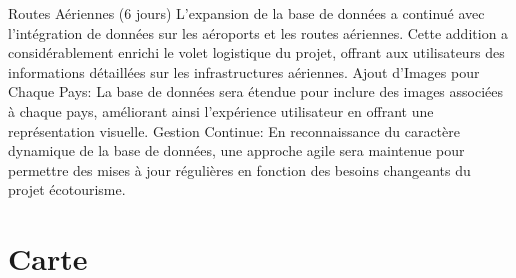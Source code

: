 \documentclass[mstat,12pt]{unswthesis}
\begin{document}
\begin{adjustwidth}{-2cm}{}
\begin{itemize}
  Routes Aériennes (6 jours) L'expansion de la base de données a
  continué avec l'intégration de données sur les aéroports et les routes
  aériennes. Cette addition a considérablement enrichi le volet
  logistique du projet, offrant aux utilisateurs des informations
  détaillées sur les infrastructures aériennes. Ajout d'Images pour
  Chaque Pays: La base de données sera étendue pour inclure des images
  associées à chaque pays, améliorant ainsi l'expérience utilisateur en
  offrant une représentation visuelle. Gestion Continue: En
  reconnaissance du caractère dynamique de la base de données, une
  approche agile sera maintenue pour permettre des mises à jour
  régulières en fonction des besoins changeants du projet écotourisme.
\end{itemize}

\hypertarget{carte}{%
\section{Carte}\label{carte}}


\end{adjustwidth}
\end{document}
